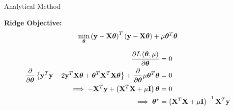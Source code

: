 \documentclass{beamer}
\begin{document}
\begin{frame}{Analytical Method}
\begin{tcolorbox}
\textbf{Ridge Objective:}
\vspace{-0.4cm}
$$
\min_{\boldsymbol{\theta}} \left(\mathbf{y}-\mathbf{X}\boldsymbol{\theta}\right)^T\left(\mathbf{y}-\mathbf{X}\boldsymbol{\theta}\right)+ \mu\boldsymbol{\theta}^T\boldsymbol{\theta}
$$
\end{tcolorbox}
\begin{align*}
\frac{\partial L\left(\boldsymbol{\theta}, \mu\right)}{\partial \boldsymbol{\theta}} &= 0 \\ 
\frac{\partial}{\partial \boldsymbol{\theta}}\left\lbrace \mathbf{y}^T\mathbf{y} - 2\mathbf{y}^T\mathbf{X}\boldsymbol{\theta} + \boldsymbol{\theta}^T\mathbf{X}^T\mathbf{X}\boldsymbol{\theta} \right\rbrace +  \frac{\partial}{\partial \boldsymbol{\theta}} \mu\boldsymbol{\theta}^T\boldsymbol{\theta} &= 0 \\
\implies -\mathbf{X}^T\mathbf{y} + \left(\mathbf{X}^T\mathbf{X} + \mu \mathbf{I}\right)\boldsymbol{\theta} &= 0 \\
\implies \boldsymbol{\theta}^* &= \left(\mathbf{X}^T\mathbf{X} + \mu \mathbf{I}\right)^{-1}\mathbf{X}^T\mathbf{y}
\end{align*}
\end{frame}
\end{document}
